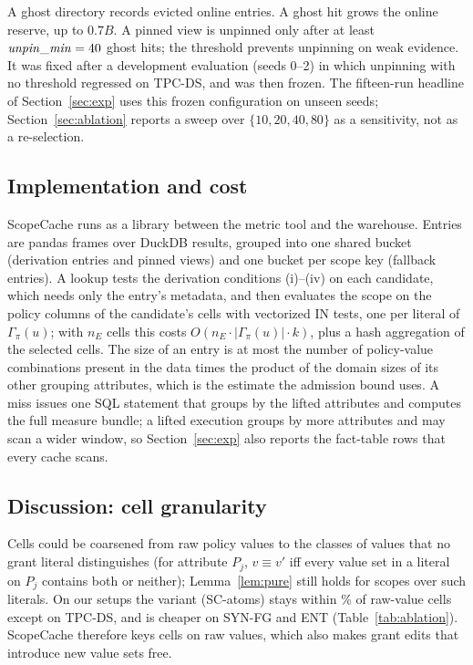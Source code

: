 \documentclass[sigconf, nonacm]{acmart}
\newcommand{\M}[1]{\textsf{#1}}
\begin{document}
A ghost directory records evicted online entries. A ghost hit grows the online reserve, up to $0.7B$. A pinned view is unpinned only after at least $\mathit{unpin\_min}=40{}$ ghost hits; the threshold prevents unpinning on weak evidence. It was fixed after a development evaluation (seeds 0--2) in which unpinning with no threshold regressed on TPC-DS, and was then frozen. The fifteen-run headline of Section~\ref{sec:exp} uses this frozen configuration on unseen seeds; Section~\ref{sec:ablation} reports a sweep over $\{10,20,40,80\}$ as a sensitivity, not as a re-selection.

\subsection{Implementation and cost}
\label{sec:impl}
ScopeCache runs as a library between the metric tool and the warehouse. Entries are pandas frames over DuckDB results, grouped into one shared bucket (derivation entries and pinned views) and one bucket per scope key (fallback entries). A lookup tests the derivation conditions (i)--(iv) on each candidate, which needs only the entry's metadata, and then evaluates the scope on the policy columns of the candidate's cells with vectorized IN tests, one per literal of $\Gamma_\pi(u)$; with $n_E$ cells this costs $O(n_E\cdot|\Gamma_\pi(u)|\cdot k)$, plus a hash aggregation of the selected cells. The size of an entry is at most the number of policy-value combinations present in the data times the product of the domain sizes of its other grouping attributes, which is the estimate the admission bound uses. A miss issues one SQL statement that groups by the lifted attributes and computes the full measure bundle; a lifted execution groups by more attributes and may scan a wider window, so Section~\ref{sec:exp} also reports the fact-table rows that every cache scans.

\subsection{Discussion: cell granularity}
\label{sec:granularity}
Cells could be coarsened from raw policy values to the classes of values that no grant literal distinguishes (for attribute $P_j$, $v\equiv v'$ iff every value set in a literal on $P_j$ contains both or neither); Lemma~\ref{lem:pure} still holds for scopes over such literals. On our setups the variant (\M{SC-atoms}) stays within \atomsMeanSave\% of raw-value cells except on TPC-DS, and is cheaper on SYN-FG and ENT (Table~\ref{tab:ablation}). ScopeCache therefore keys cells on raw values, which also makes grant edits that introduce new value sets free.
\end{document}
